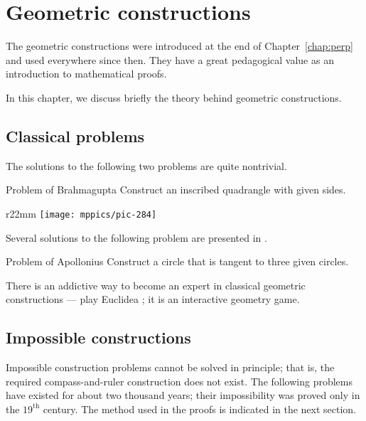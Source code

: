 \chapter{Geometric constructions}
\label{chap:car}


The geometric constructions were introduced at the end of Chapter~\ref{chap:perp} and used everywhere since then.
They have a great pedagogical value as an introduction to mathematical proofs.

In this chapter, we discuss briefly the theory behind geometric constructions.


%
%

\section{Classical problems}

The solutions to the following two problems are quite nontrivial.

\begin{thm}{Problem of Brahmagupta} 
Construct an inscribed quadrangle with given sides.
\end{thm}

{

\begin{wrapfigure}[7]{r}{22mm}
\vskip-6mm
\centering
\texttt{[image: mppics/pic-284]}
\end{wrapfigure}

Several solutions to the following problem are presented in \cite{hadamard}.
 
\begin{thm}{Problem of Apollonius} Construct a circle that is tangent to three given circles.
\end{thm}

There is an addictive way to become an expert in classical geometric constructions ---
play Euclidea \cite{euclidea}; it is an interactive geometry game.

}

\section{Impossible constructions}

Impossible construction problems cannot be solved in principle; 
that is, the required compass-and-ruler construction does not exist.
The following problems have existed for about two thousand years;
their impossibility was proved only in the $19^\text{th}$ century.
The method used in the proofs is indicated in the next section.


